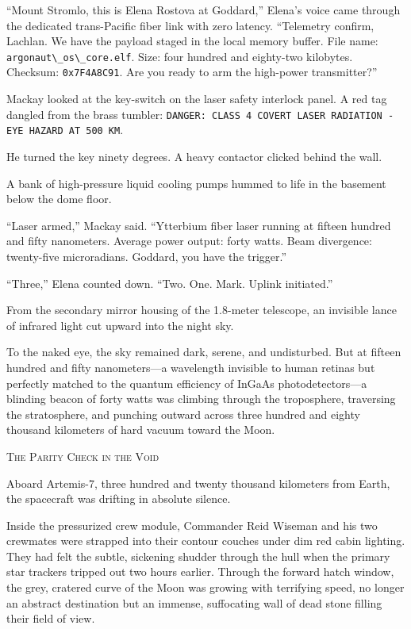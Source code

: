 \documentclass[12pt,twoside,openright]{book}
\newcommand{\sceneheader}[1]{%
  \par\vspace{1.8em}%
  {\noindent\centering\scshape\large #1\par}%
  \vspace{1.0em}%
  \noindent%
}
\newcommand{\dinkus}{%
  \par\vspace{1.2em}%
  {\noindent\centering{\large $\ast\quad\ast\quad\ast$}\par}%
  \vspace{1.2em}%
  \noindent%
}
\begin{document}
``Mount Stromlo, this is Elena Rostova at Goddard,'' Elena's voice came
through the dedicated trans-Pacific fiber link with zero latency.
``Telemetry confirm, Lachlan. We have the payload staged in the local
memory buffer. File name:
\passthrough{\lstinline!argonaut\_os\_core.elf!}. Size: four hundred and
eighty-two kilobytes. Checksum: \passthrough{\lstinline!0x7F4A8C91!}.
Are you ready to arm the high-power transmitter?''

Mackay looked at the key-switch on the laser safety interlock panel. A
red tag dangled from the brass tumbler:
\passthrough{\lstinline!DANGER: CLASS 4 COVERT LASER RADIATION - EYE HAZARD AT 500 KM!}.

He turned the key ninety degrees. A heavy contactor clicked behind the
wall.

A bank of high-pressure liquid cooling pumps hummed to life in the
basement below the dome floor.

``Laser armed,'' Mackay said. ``Ytterbium fiber laser running at fifteen
hundred and fifty nanometers. Average power output: forty watts. Beam
divergence: twenty-five microradians. Goddard, you have the trigger.''

``Three,'' Elena counted down. ``Two. One. Mark. Uplink initiated.''

From the secondary mirror housing of the 1.8-meter telescope, an
invisible lance of infrared light cut upward into the night sky.

To the naked eye, the sky remained dark, serene, and undisturbed. But at
fifteen hundred and fifty nanometers---a wavelength invisible to human
retinas but perfectly matched to the quantum efficiency of InGaAs
photodetectors---a blinding beacon of forty watts was climbing through
the troposphere, traversing the stratosphere, and punching outward
across three hundred and eighty thousand kilometers of hard vacuum
toward the Moon.

\dinkus

\sceneheader{The Parity Check in the
Void}

Aboard Artemis-7, three hundred and twenty thousand kilometers from
Earth, the spacecraft was drifting in absolute silence.

Inside the pressurized crew module, Commander Reid Wiseman and his two
crewmates were strapped into their contour couches under dim red cabin
lighting. They had felt the subtle, sickening shudder through the hull
when the primary star trackers tripped out two hours earlier. Through
the forward hatch window, the grey, cratered curve of the Moon was
growing with terrifying speed, no longer an abstract destination but an
immense, suffocating wall of dead stone filling their field of view.
\end{document}
